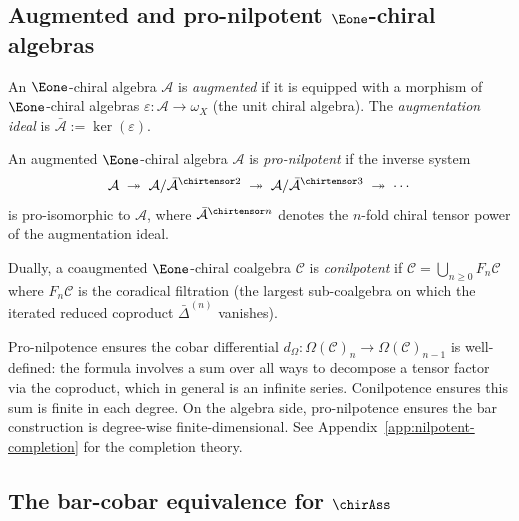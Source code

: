 \subsection{\texorpdfstring{Augmented and pro-nilpotent $\Eone$-chiral algebras}{Augmented and pro-nilpotent E1-chiral algebras}}

\begin{definition}
\label{def:augmented-e1}
An $\Eone$-chiral algebra $\mathcal{A}$ is \emph{augmented} if it
is equipped with a morphism of $\Eone$-chiral algebras
$\varepsilon: \mathcal{A} \to \omega_X$ (the unit chiral algebra).
The \emph{augmentation ideal} is
$\bar{\mathcal{A}} := \ker(\varepsilon)$.
\end{definition}

\begin{definition}
\label{def:pronilpotent-conilpotent}
An augmented $\Eone$-chiral algebra $\mathcal{A}$ is
\emph{pro-nilpotent} if the inverse system
\[
\mathcal{A} \;\twoheadrightarrow\;
\mathcal{A}/\bar{\mathcal{A}}^{\chirtensor 2} \;\twoheadrightarrow\;
\mathcal{A}/\bar{\mathcal{A}}^{\chirtensor 3} \;\twoheadrightarrow\;
\cdots
\]
is pro-isomorphic to $\mathcal{A}$, where
$\bar{\mathcal{A}}^{\chirtensor n}$ denotes the $n$-fold chiral
tensor power of the augmentation ideal.

Dually, a coaugmented $\Eone$-chiral coalgebra $\mathcal{C}$ is
\emph{conilpotent} if
$\mathcal{C} = \bigcup_{n \geq 0} F_n\mathcal{C}$
where $F_n\mathcal{C}$ is the coradical filtration
(the largest sub-coalgebra on which the iterated reduced coproduct
$\bar{\Delta}^{(n)}$ vanishes).
\end{definition}

\begin{remark}\label{rem:convergence-pro-nil}
\label{rem:convergence-pronilpotent}
Pro-nilpotence ensures the cobar differential
$d_\Omega: \Omega(\mathcal{C})_n \to \Omega(\mathcal{C})_{n-1}$
is well-defined: the formula involves a sum over all ways to
decompose a tensor factor via the coproduct, which in general is an
infinite series. Conilpotence ensures this sum is finite in each
degree. On the algebra side, pro-nilpotence ensures the bar
construction is degree-wise finite-dimensional.
See Appendix~\ref{app:nilpotent-completion} for the completion
theory.
\end{remark}

\subsection{\texorpdfstring{The bar-cobar equivalence for $\chirAss$}{The bar-cobar equivalence for Ass ch}}

